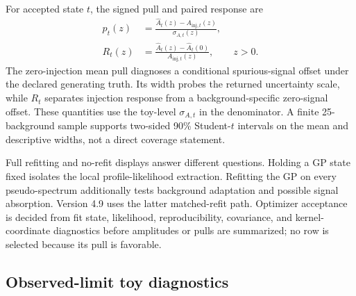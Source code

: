 For accepted state $t$, the signed pull and paired response are
\begin{align}
p_t(z)&=\frac{\widehat A_t(z)-A_{\mathrm{inj},t}(z)}
                  {\sigma_{A,t}(z)},
\label{eq:v4p9-pull}\\
R_t(z)&=\frac{\widehat A_t(z)-\widehat A_t(0)}
                  {A_{\mathrm{inj},t}(z)},\qquad z>0.
\label{eq:v4p9-paired-response}
\end{align}
The zero-injection mean pull diagnoses a conditional spurious-signal offset under the
declared generating truth.  Its width probes the returned uncertainty scale, while
$R_t$ separates injection response from a background-specific zero-signal offset.
These quantities use the toy-level $\sigma_{A,t}$ in the denominator.  A finite
25-background sample supports two-sided 90\% Student-$t$ intervals on the mean and descriptive
widths, not a direct coverage statement.

Full refitting and no-refit displays answer different questions.  Holding a GP state
fixed isolates the local profile-likelihood extraction.  Refitting the GP on every
pseudo-spectrum additionally tests background adaptation and possible signal
absorption.  Version 4.9 uses the latter matched-refit path.  Optimizer acceptance is
decided from fit state, likelihood, reproducibility, covariance, and kernel-coordinate
diagnostics before amplitudes or pulls are summarized; no row is selected because its
pull is favorable.

\subsection{Observed-limit toy diagnostics}

